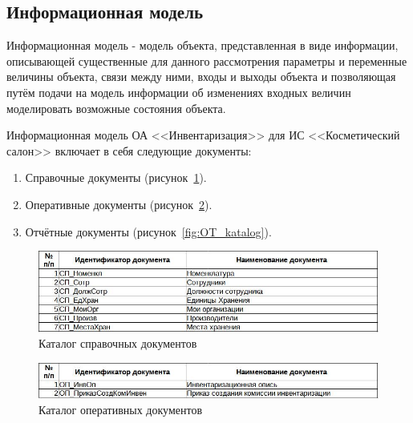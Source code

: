 \newpage
\subsection{Информационная модель}
Информационная модель - модель объекта, представленная в виде информации,
описывающей существенные для данного рассмотрения параметры и переменные величины объекта,
связи между ними, входы и выходы объекта и позволяющая путём подачи на модель информации об изменениях
входных величин моделировать возможные состояния объекта.

Информационная модель ОА <<Инвентаризация>> для ИС <<Косметический салон>> включает в себя следующие документы:

\begin{enumerate}
    \item[1.] Справочные документы (рисунок~\ref{fig:CP_katalog}).
    \item[2.] Оперативные документы (рисунок~\ref{fig:OP_katalog}).
    \item[3.] Отчётные документы (рисунок~\ref{fig:OT_katalog}).
\end{enumerate}


\begin{figure}[!h]
    \centering
    \includegraphics[width=14cm]
        {_docs/СП_каталог.jpg}
    \caption{Каталог справочных документов}
    \label{fig:CP_katalog}
\end{figure}


\begin{figure}[!h]
    \centering
    \includegraphics[width=14cm]
        {_docs/ОП_каталог.jpg}
    \caption{Каталог оперативных документов}
    \label{fig:OP_katalog}
\end{figure}


